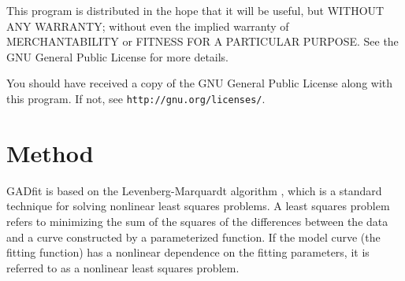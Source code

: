 \documentclass{article}
\begin{document}
This program is distributed in the hope that it will be useful, but WITHOUT ANY WARRANTY; without even the implied warranty of MERCHANTABILITY or FITNESS FOR A PARTICULAR PURPOSE. See the GNU General Public License for more details.

You should have received a copy of the GNU General Public License along with this program.  If not, see \texttt{http://gnu.org/licenses/}.

\section{Method}

GADfit is based on the Levenberg-Marquardt algorithm \cite{marquardt63}, which is a standard technique for solving nonlinear least squares problems. A least squares problem refers to minimizing the sum of the squares of the differences between the data and a curve constructed by a parameterized function. If the model curve (the fitting function) has a nonlinear dependence on the fitting parameters, it is referred to as a nonlinear least squares problem.
\end{document}
